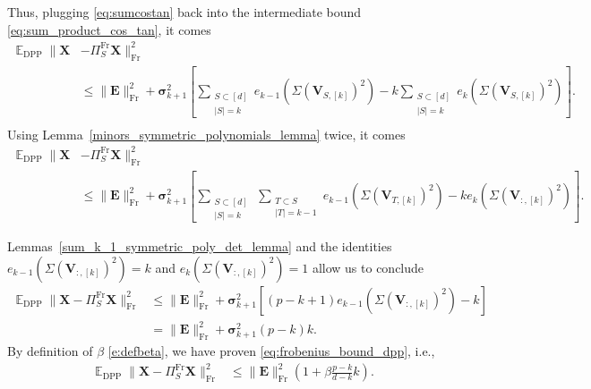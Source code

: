 \documentclass[twoside,11pt]{book}
\numberwithin{theorem}{chapter}
\numberwithin{definition}{chapter}
\numberwithin{proposition}{chapter}
\numberwithin{corollary}{chapter}
\numberwithin{example}{chapter}
\numberwithin{lemma}{chapter}
\numberwithin{assumption}{chapter}
\DeclareMathOperator{\Fr}{\mathrm{Fr}}
\DeclareMathOperator{\DPP}{\mathrm{DPP}}
\DeclareMathOperator{\EX}{\mathbb{E}}
\begin{document}
Thus, plugging \eqref{eq:sumcostan} back into the intermediate bound \eqref{eq:sum_product_cos_tan}, it comes
\begin{align}\label{eq:bound_tan_in_expectation_under_sparsity}
    \EX_{\DPP} \| \bm{X} &- \Pi_{S}^{\Fr}\bm{X} \|_{\Fr}^{2}\nonumber\\
      &\leq \| \bm{E}\|_{\Fr}^{2} + \bm{\sigma}_{k+1}^{2} \left[\sum\limits_{\substack{S \subset [d]\\ |S| = k}} e_{k-1}(\Sigma(\bm{V}_{S,[k]})^{2}) -  k \sum_{\substack{S \subset [d]\\ |S| = k}}e_{k}(\Sigma(\bm{V}_{S,[k]})^{2})\right]\nonumber.\\
\end{align}
Using Lemma~\ref{minors_symmetric_polynomials_lemma} twice, it comes
\begin{align}
  \EX_{\DPP} \| \bm{X} &- \Pi_{S}^{\Fr}\bm{X} \|_{\Fr}^{2} \nonumber\\
  &\leq \| \bm{E}\|_{\Fr}^{2} + \bm{\sigma}_{k+1}^{2} \left[\sum_{\substack{S \subset [d]\\ |S| = k}} \,\sum_{\substack{T \subset S\\ |T| = k-1}} e_{k-1}(\Sigma(\bm{V}_{T,[k]})^{2}) -  ke_{k}(\Sigma(\bm{V}_{:,[k]})^{2})\right]
  \label{e:doubleSumTrick}.
\end{align}

Lemmas~\ref{sum_k_1_symmetric_poly_det_lemma} and the identities $e_{k-1}(\Sigma(\bm{V}_{:,[k]})^{2}) = k$ and $e_{k}(\Sigma(\bm{V}_{:,[k]})^{2}) = 1$ allow us to conclude
\begin{align}
  \EX_{\DPP} \| \bm{X} - \Pi_{S}^{\Fr}\bm{X} \|_{\Fr}^{2} &\leq \| \bm{E}\|_{\Fr}^{2} + \bm{\sigma}_{k+1}^{2} \left[ (p-k+1)e_{k-1}(\Sigma(\bm{V}_{:,[k]})^{2}) -  k \right]\\
  &=\| \bm{E}\|_{\Fr}^{2} + \bm{\sigma}_{k+1}^{2} (p-k)k.
\end{align}
By definition of $\beta$ \eqref{e:defbeta}, we have proven \eqref{eq:frobenius_bound_dpp}, i.e.,
\begin{align*}
    \EX_{\DPP} \| \bm{X} - \Pi_{S}^{\Fr}\bm{X} \|_{\Fr}^{2}
  & \leq \| \bm{E}\|_{\Fr}^{2} \left(1 + \beta \frac{p-k}{d-k}k \right).
\end{align*}
\end{document}
